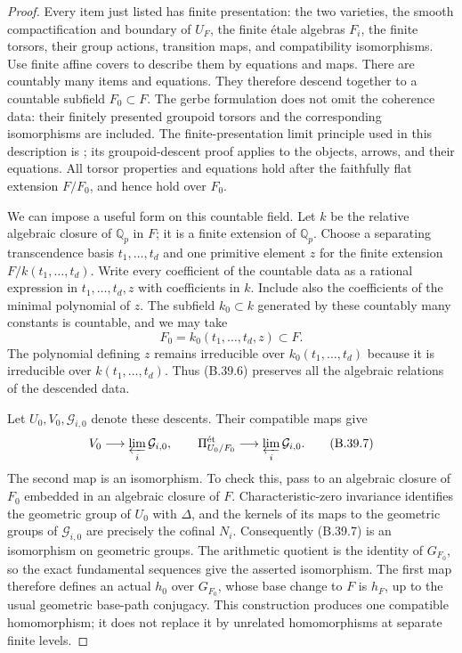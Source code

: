 \begin{proof}
Every item just listed has finite presentation:
the two varieties, the smooth compactification and
boundary of $U_F$, the finite \'etale algebras $F_i$,
the finite torsors, their group actions, transition
maps, and compatibility isomorphisms. Use finite
affine covers to describe them by equations and
maps. There are countably many items and equations.
They therefore descend together to a countable
subfield $F_0\subset F$. The gerbe formulation
does not omit the coherence data: their finitely
presented groupoid torsors and the corresponding
isomorphisms are included. The finite-presentation
limit principle used in this description is
\cite[Lemma 102.3.7, Tag 0CMX]{B_StacksLimits};
its groupoid-descent proof applies to the objects,
arrows, and their equations. All torsor properties
and equations hold after the faithfully flat
extension $F/F_0$, and hence hold over $F_0$.

We can impose a useful form on this countable
field. Let $k$ be the relative algebraic closure
of $\mathbb Q_p$ in $F$; it is a finite extension
of $\mathbb Q_p$. Choose a separating transcendence
basis $t_1,\ldots,t_d$ and one primitive element
$z$ for the finite extension $F/k(t_1,\ldots,t_d)$.
Write every coefficient of the countable data as
a rational expression in $t_1,\ldots,t_d,z$ with
coefficients in $k$. Include also the coefficients
of the minimal polynomial of $z$. The subfield
$k_0\subset k$ generated by these countably many
constants is countable, and we may take
\[
 F_0=k_0(t_1,\ldots,t_d,z)\subset F.
 \tag{B.39.6}
\]
The polynomial defining $z$ remains irreducible
over $k_0(t_1,\ldots,t_d)$ because it is irreducible
over $k(t_1,\ldots,t_d)$. Thus (B.39.6) preserves
all the algebraic relations of the descended data.

Let $U_0,V_0,\mathcal G_{i,0}$ denote these descents.
Their compatible maps give
\[
 V_0\longrightarrow\varprojlim_i\mathcal G_{i,0},
 \qquad
 \Pi^{\mathrm{\acute et}}_{U_0/F_0}
       \longrightarrow\varprojlim_i\mathcal G_{i,0}.
 \tag{B.39.7}
\]
The second map is an isomorphism. To check this,
pass to an algebraic closure of $F_0$ embedded in
an algebraic closure of $F$. Characteristic-zero
invariance identifies the geometric group of
$U_0$ with $\Delta$, and the kernels of its maps
to the geometric groups of $\mathcal G_{i,0}$
are precisely the cofinal $N_i$. Consequently
(B.39.7) is an isomorphism on geometric groups.
The arithmetic quotient is the identity of
$G_{F_0}$, so the exact fundamental sequences
give the asserted isomorphism. The first map
therefore defines an actual $h_0$ over $G_{F_0}$,
whose base change to $F$ is $h_F$, up to the usual
geometric base-path conjugacy. This construction
produces one compatible homomorphism; it does not
replace it by unrelated homomorphisms at separate
finite levels.


\end{proof}
